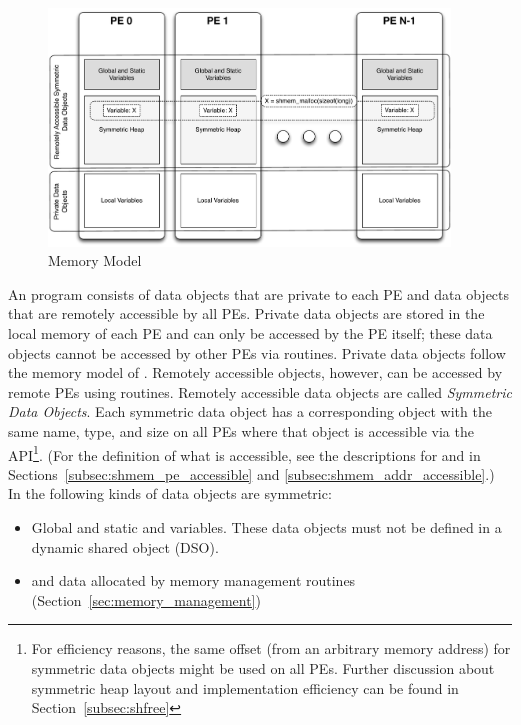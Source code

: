 \begin{figure}[h]
\includegraphics[width=0.95\textwidth]{figures/mem_model}
\caption{\openshmem Memory Model}
\label{fig:mem_model}
\end{figure}
%
An \openshmem program consists of data objects that are private to each \ac{PE}
and data  objects that are remotely accessible by all \acp{PE}. Private data
objects are stored in the local memory of each \ac{PE} and can only be accessed
by the \ac{PE} itself; these data objects cannot be accessed by other \acp{PE}
via \openshmem routines. Private data objects follow the memory model of
\Cstd. Remotely accessible objects, however, can be accessed by
remote \acp{PE} using \openshmem routines.  Remotely accessible data objects are
called \emph{Symmetric Data Objects}.  Each symmetric data object has a
corresponding object with the same name, type, and size on all \acp{PE} where that object is
accessible via the \openshmem \ac{API}\footnote{For efficiency reasons,
the same offset (from an arbitrary memory address) for symmetric data
objects might be used on all \acp{PE}. Further discussion about symmetric heap
layout and implementation efficiency can be found in Section~\ref{subsec:shfree}}.
(For the definition of what is accessible, see the
descriptions for  and 
in Sections~\ref{subsec:shmem_pe_accessible} and
\ref{subsec:shmem_addr_accessible}.) In \openshmem the following kinds of
data objects are symmetric:
%
\begin{itemize}
\item Global and static \Cstd and \Cpp variables. These data objects must
  not be defined in a dynamic shared object (DSO).
\item \Cstd and \Cpp data allocated by \openshmem memory management routines
  (Section~\ref{sec:memory_management})
\end{itemize}

